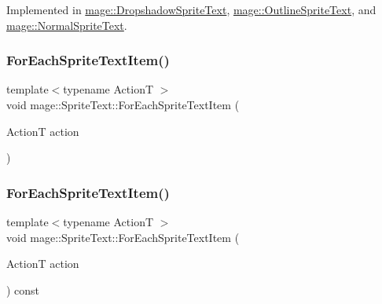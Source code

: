 Implemented in \hyperlink{classmage_1_1_dropshadow_sprite_text_af76422c9812d7dc38e9b98e587103c67}{mage\+::\+Dropshadow\+Sprite\+Text}, \hyperlink{classmage_1_1_outline_sprite_text_a524e9ad1caeeeaa32405e61d1a5e1032}{mage\+::\+Outline\+Sprite\+Text}, and \hyperlink{classmage_1_1_normal_sprite_text_ad2a1b02bea18afd6bf61b106a727a355}{mage\+::\+Normal\+Sprite\+Text}.

\hypertarget{classmage_1_1_sprite_text_af1236ba7c80c61be058a21ef1d4c483d}{}\label{classmage_1_1_sprite_text_af1236ba7c80c61be058a21ef1d4c483d} 
\subsubsection{\texorpdfstring{For\+Each\+Sprite\+Text\+Item()}{ForEachSpriteTextItem()}\hspace{0.1cm}{\footnotesize\ttfamily [1/2]}}
{\footnotesize\ttfamily template$<$typename ActionT $>$ \\
void mage\+::\+Sprite\+Text\+::\+For\+Each\+Sprite\+Text\+Item (\begin{DoxyParamCaption}\item[{ActionT}]{action }\end{DoxyParamCaption})\hspace{0.3cm}{\ttfamily [protected]}}

\hypertarget{classmage_1_1_sprite_text_ab8576580e5b3c0bb568c1256a0b989bc}{}\label{classmage_1_1_sprite_text_ab8576580e5b3c0bb568c1256a0b989bc} 
\subsubsection{\texorpdfstring{For\+Each\+Sprite\+Text\+Item()}{ForEachSpriteTextItem()}\hspace{0.1cm}{\footnotesize\ttfamily [2/2]}}
{\footnotesize\ttfamily template$<$typename ActionT $>$ \\
void mage\+::\+Sprite\+Text\+::\+For\+Each\+Sprite\+Text\+Item (\begin{DoxyParamCaption}\item[{ActionT}]{action }\end{DoxyParamCaption}) const\hspace{0.3cm}{\ttfamily [protected]}}


